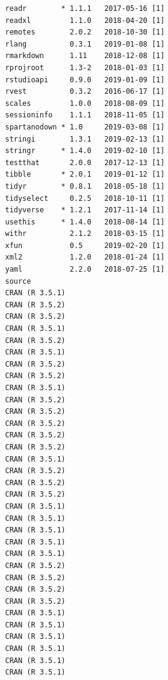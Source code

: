 \documentclass[ms]{uncgdissertationexp}
\theoremstyle{plain}
\theoremstyle{definition}
\theoremstyle{remark}
\begin{document}
\begin{verbatim}
   readr        * 1.1.1   2017-05-16 [1]
   readxl         1.1.0   2018-04-20 [1]
   remotes        2.0.2   2018-10-30 [1]
   rlang          0.3.1   2019-01-08 [1]
   rmarkdown      1.11    2018-12-08 [1]
   rprojroot      1.3-2   2018-01-03 [1]
   rstudioapi     0.9.0   2019-01-09 [1]
   rvest          0.3.2   2016-06-17 [1]
   scales         1.0.0   2018-08-09 [1]
   sessioninfo    1.1.1   2018-11-05 [1]
   spartanodown * 1.0     2019-03-08 [1]
   stringi        1.3.1   2019-02-13 [1]
   stringr      * 1.4.0   2019-02-10 [1]
   testthat       2.0.0   2017-12-13 [1]
   tibble       * 2.0.1   2019-01-12 [1]
   tidyr        * 0.8.1   2018-05-18 [1]
   tidyselect     0.2.5   2018-10-11 [1]
   tidyverse    * 1.2.1   2017-11-14 [1]
   usethis      * 1.4.0   2018-08-14 [1]
   withr          2.1.2   2018-03-15 [1]
   xfun           0.5     2019-02-20 [1]
   xml2           1.2.0   2018-01-24 [1]
   yaml           2.2.0   2018-07-25 [1]
   source                                       
   CRAN (R 3.5.1)                               
   CRAN (R 3.5.2)                               
   CRAN (R 3.5.2)                               
   CRAN (R 3.5.1)                               
   CRAN (R 3.5.2)                               
   CRAN (R 3.5.1)                               
   CRAN (R 3.5.2)                               
   CRAN (R 3.5.2)                               
   CRAN (R 3.5.1)                               
   CRAN (R 3.5.2)                               
   CRAN (R 3.5.2)                               
   CRAN (R 3.5.2)                               
   CRAN (R 3.5.2)                               
   CRAN (R 3.5.2)                               
   CRAN (R 3.5.1)                               
   CRAN (R 3.5.2)                               
   CRAN (R 3.5.2)                               
   CRAN (R 3.5.2)                               
   CRAN (R 3.5.1)                               
   CRAN (R 3.5.1)                               
   CRAN (R 3.5.1)                               
   CRAN (R 3.5.1)                               
   CRAN (R 3.5.1)                               
   CRAN (R 3.5.2)                               
   CRAN (R 3.5.2)                               
   CRAN (R 3.5.2)                               
   CRAN (R 3.5.2)                               
   CRAN (R 3.5.1)                               
   CRAN (R 3.5.1)                               
   CRAN (R 3.5.1)                               
   CRAN (R 3.5.1)                               
   CRAN (R 3.5.1)                               
   CRAN (R 3.5.1)                               

\end{verbatim}
\end{document}
